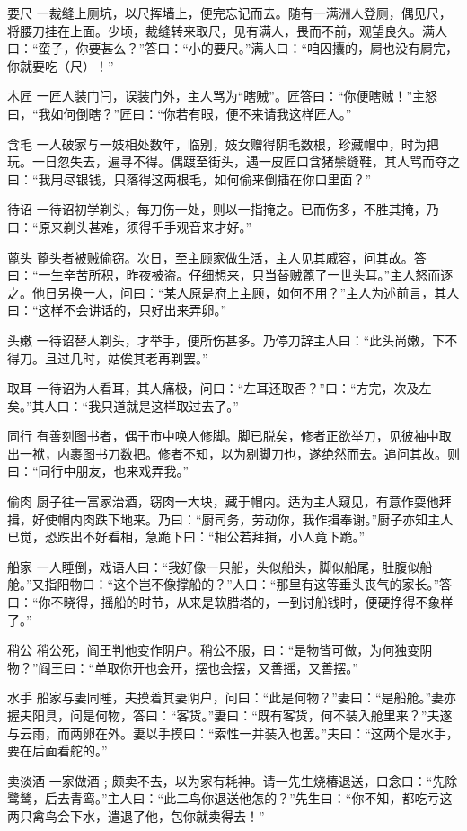 \documentclass[12pt,UTF8]{ctexbook}
\begin{document}
要尺
一裁缝上厕坑，以尺挥墙上，便完忘记而去。随有一满洲人登厕，偶见尺，将腰刀挂在上面。少顷，裁缝转来取尺，见有满人，畏而不前，观望良久。满人曰：“蛮子，你要甚么？”答曰：“小的要尺。”满人曰：“咱囚攮的，屙也没有屙完，你就要吃（尺）！”

木匠
一匠人装门闩，误装门外，主人骂为“瞎贼”。匠答曰：“你便瞎贼！”主怒曰，“我如何倒瞎？”匠曰：“你若有眼，便不来请我这样匠人。”

含毛
一人破家与一妓相处数年，临别，妓女赠得阴毛数根，珍藏帽中，时为把玩。一日忽失去，遍寻不得。偶踱至街头，遇一皮匠口含猪鬃缝鞋，其人骂而夺之曰：“我用尽银钱，只落得这两根毛，如何偷来倒插在你口里面？”

待诏
一待诏初学剃头，每刀伤一处，则以一指掩之。已而伤多，不胜其掩，乃曰：“原来剃头甚难，须得千手观音来才好。”

蓖头
蓖头者被贼偷窃。次日，至主顾家做生活，主人见其戚容，问其故。答曰：“一生辛苦所积，昨夜被盗。仔细想来，只当替贼蓖了一世头耳。”主人怒而逐之。他日另换一人，问曰：“某人原是府上主顾，如何不用？”主人为述前言，其人曰：“这样不会讲话的，只好出来弄卵。”

头嫩
一待诏替人剃头，才举手，便所伤甚多。乃停刀辞主人曰：“此头尚嫩，下不得刀。且过几时，姑俟其老再剃罢。”

取耳
一待诏为人看耳，其人痛极，问曰：“左耳还取否？”曰：“方完，次及左矣。”其人曰：“我只道就是这样取过去了。”

同行
有善刻图书者，偶于市中唤人修脚。脚已脱矣，修者正欲举刀，见彼袖中取出一袱，内裹图书刀数把。修者不知，以为剔脚刀也，遂绝然而去。追问其故。则曰：“同行中朋友，也来戏弄我。”

偷肉
厨子往一富家治酒，窃肉一大块，藏于帽内。适为主人窥见，有意作耍他拜揖，好使帽内肉跌下地来。乃曰：“厨司务，劳动你，我作揖奉谢。”厨子亦知主人已觉，恐跌出不好看相，急跪下曰：“相公若拜揖，小人竟下跪。”

船家
一人睡倒，戏语人曰：“我好像一只船，头似船头，脚似船尾，肚腹似船舱。”又指阳物曰：“这个岂不像撑船的？”人曰：“那里有这等垂头丧气的家长。”答曰：“你不晓得，摇船的时节，从来是软腊塔的，一到讨船钱时，便硬挣得不象样了。”

稍公
稍公死，阎王判他变作阴户。稍公不服，曰：“是物皆可做，为何独变阴物？”阎王曰：“单取你开也会开，摆也会摆，又善摇，又善摆。”

水手
船家与妻同睡，夫摸着其妻阴户，问曰：“此是何物？”妻曰：“是船舱。”妻亦握夫阳具，问是何物，答曰：“客货。”妻曰：“既有客货，何不装入舱里来？”夫遂与云雨，而两卵在外。妻以手摸曰：“索性一并装入也罢。”夫曰：“这两个是水手，要在后面看舵的。”

卖淡酒
一家做酒﹔颇卖不去，以为家有耗神。请一先生烧椿退送，口念曰：“先除鹭鸶，后去青鸾。”主人曰：“此二鸟你退送他怎的？”先生曰：“你不知，都吃亏这两只禽鸟会下水，遣退了他，包你就卖得去！”
\end{document}
